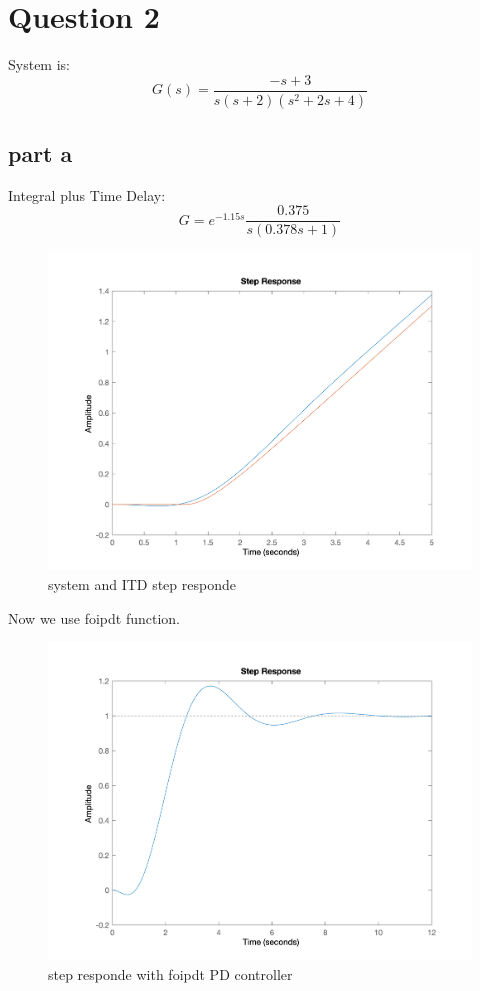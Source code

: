 \section{Question 2}
System is:
$$
G(s) = \frac{-s + 3}{s(s+2)(s^2+2s+4)}
$$
\subsection{part a}
Integral plus Time Delay:
$$
G = e^{-1.15s}\dfrac{0.375}{s(0.378s +  1)}       
$$
\begin{figure}[H]
    \caption{system and ITD step responde}
    \centering
    \includegraphics[width=12cm]{../Figure/Q2/IDT1.png}
\end{figure}
Now we use foipdt function.
\begin{figure}[H]
    \caption{step responde with foipdt PD controller}
    \centering
    \includegraphics[width=12cm]{../Figure/Q2/foipdt_PD.png}
\end{figure}
